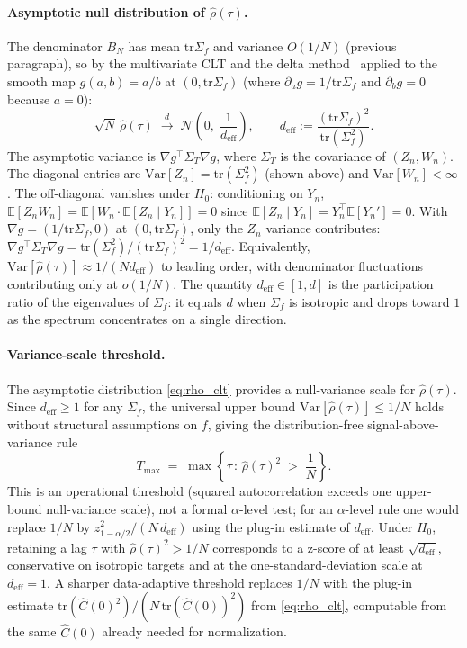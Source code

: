 \documentclass{article}
\newcommand{\E}{\mathbb{E}}
\newcommand{\Var}{\mathrm{Var}}
\newcommand{\tr}{\mathrm{tr}}
\begin{document}
\paragraph{Asymptotic null distribution of $\hat\rho(\tau)$.}
The denominator $B_N$ has mean $\tr\Sigma_f$ and variance $O(1/N)$
(previous paragraph), so by the multivariate CLT and the delta
method~\cite{vanderVaart1998} applied to the smooth map $g(a, b) = a/b$ at
$(0, \tr\Sigma_f)$ (where $\partial_a g = 1/\tr\Sigma_f$ and $\partial_b g = 0$
because $a = 0$):
\begin{equation}
\sqrt{N}\,\hat\rho(\tau) \;\xrightarrow{d}\; \mathcal{N}\!\left(0,\; \frac{1}{d_{\mathrm{eff}}}\right),
\qquad
d_{\mathrm{eff}} := \frac{(\tr\Sigma_f)^2}{\tr(\Sigma_f^2)}.
\label{eq:rho_clt}
\end{equation}
The asymptotic variance is $\nabla g^\top \Sigma_T \nabla g$, where
$\Sigma_T$ is the covariance of $(Z_n, W_n)$. The diagonal entries are
$\Var[Z_n] = \tr(\Sigma_f^2)$ (shown above) and $\Var[W_n] < \infty$.
The off-diagonal vanishes under $H_0$: conditioning on $Y_n$,
$\E[Z_n W_n] = \E[W_n \cdot \E[Z_n \mid Y_n]] = 0$ since
$\E[Z_n \mid Y_n] = Y_n^\top \E[Y_n'] = 0$. With
$\nabla g = (1/\tr\Sigma_f, 0)$ at $(0, \tr\Sigma_f)$, only the $Z_n$
variance contributes: $\nabla g^\top \Sigma_T \nabla g = \tr(\Sigma_f^2)/(\tr\Sigma_f)^2 = 1/d_{\mathrm{eff}}$.
Equivalently, $\Var[\hat\rho(\tau)] \approx 1/(N d_{\mathrm{eff}})$ to
leading order, with denominator fluctuations contributing only at
$o(1/N)$. The quantity $d_{\mathrm{eff}} \in [1, d]$ is the participation
ratio of the eigenvalues of $\Sigma_f$: it equals $d$ when $\Sigma_f$ is
isotropic and drops toward $1$ as the spectrum concentrates on a single
direction.

\paragraph{Variance-scale threshold.}
The asymptotic distribution \eqref{eq:rho_clt} provides a null-variance scale for $\hat\rho(\tau)$. Since $d_{\mathrm{eff}} \geq 1$ for any $\Sigma_f$, the universal upper bound $\Var[\hat\rho(\tau)] \leq 1/N$ holds without structural assumptions on $f$, giving the distribution-free signal-above-variance rule
\begin{equation}
T_{\max} \;=\; \max\!\left\{\tau \,:\, \hat\rho(\tau)^2 \;>\; \frac{1}{N}\right\}.
\label{eq:rho_clt_threshold}
\end{equation}
This is an operational threshold (squared autocorrelation exceeds one upper-bound null-variance scale), not a formal $\alpha$-level test; for an $\alpha$-level rule one would replace $1/N$ by $z_{1-\alpha/2}^2/(N\,d_{\mathrm{eff}})$ using the plug-in estimate of $d_{\mathrm{eff}}$. Under $H_0$, retaining a lag $\tau$ with $\hat\rho(\tau)^2 > 1/N$ corresponds to a z-score of at least $\sqrt{d_{\mathrm{eff}}}$, conservative on isotropic targets and at the one-standard-deviation scale at $d_{\mathrm{eff}} = 1$. A sharper data-adaptive threshold replaces $1/N$ with the
plug-in estimate $\tr(\hat C(0)^2)/(N\,\tr(\hat C(0))^2)$ from
\eqref{eq:rho_clt}, computable from the same $\hat C(0)$ already needed
for normalization.
\end{document}
